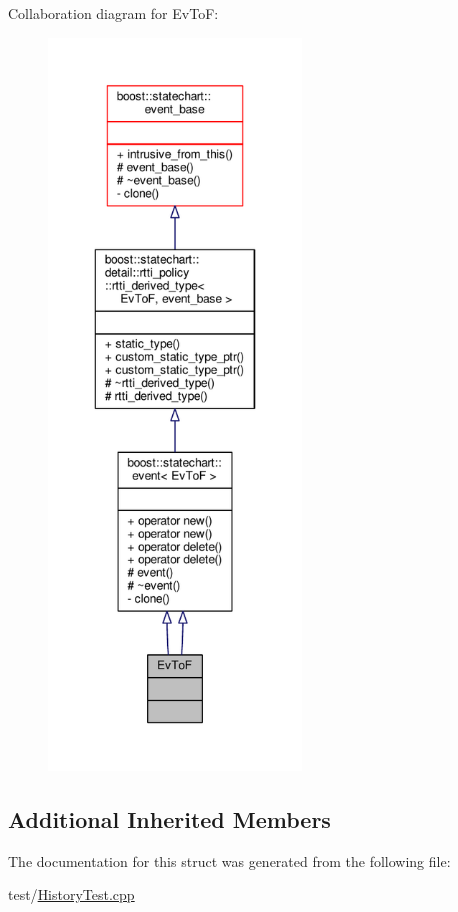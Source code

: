 Collaboration diagram for Ev\+ToF\+:
\nopagebreak
\begin{figure}[H]
\begin{center}
\leavevmode
\includegraphics[height=550pt]{struct_ev_to_f__coll__graph}
\end{center}
\end{figure}
\subsection*{Additional Inherited Members}


The documentation for this struct was generated from the following file\+:\begin{DoxyCompactItemize}
\item 
test/\mbox{\hyperlink{_history_test_8cpp}{History\+Test.\+cpp}}\end{DoxyCompactItemize}

